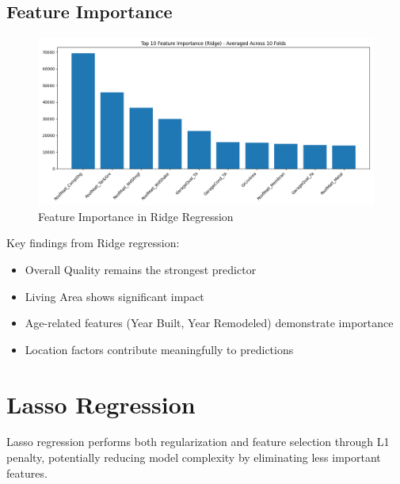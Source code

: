 \documentclass[12pt]{report}
\begin{document}
\subsection{Feature Importance}
\begin{figure}[H]
    \centering
    \includegraphics[width=1.0\textwidth]{figures/ridge_feature_importance.png}
    \caption{Feature Importance in Ridge Regression}
    \label{fig:ridge_importance}
\end{figure}

Key findings from Ridge regression:
\begin{itemize}
    \item Overall Quality remains the strongest predictor
    \item Living Area shows significant impact
    \item Age-related features (Year Built, Year Remodeled) demonstrate importance
    \item Location factors contribute meaningfully to predictions
\end{itemize}

\section{Lasso Regression}
Lasso regression performs both regularization and feature selection through L1 penalty, potentially reducing model complexity by eliminating less important features.
\end{document}
